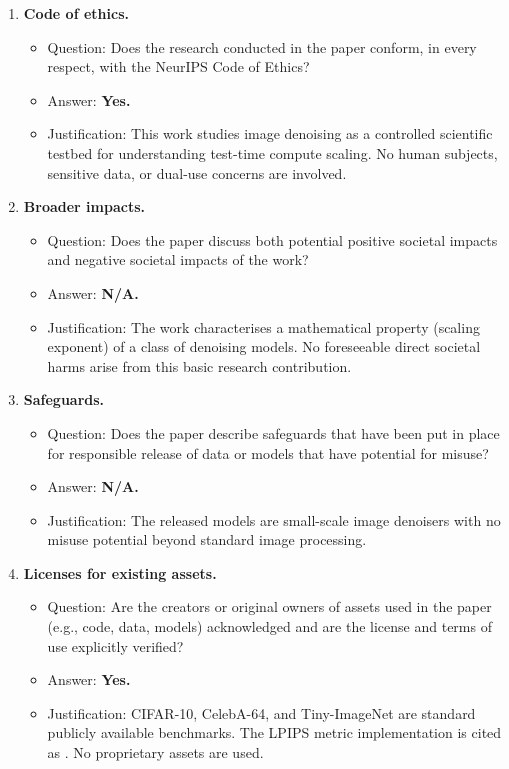 \documentclass{article}
\begin{document}
\begin{enumerate}
\item \textbf{Code of ethics.}
\begin{itemize}
  \item Question: Does the research conducted in the paper conform, in every respect, with the NeurIPS Code of Ethics?
  \item Answer: \textbf{Yes.}
  \item Justification: This work studies image denoising as a controlled scientific testbed for understanding test-time compute scaling. No human subjects, sensitive data, or dual-use concerns are involved.
\end{itemize}

\item \textbf{Broader impacts.}
\begin{itemize}
  \item Question: Does the paper discuss both potential positive societal impacts and negative societal impacts of the work?
  \item Answer: \textbf{N/A.}
  \item Justification: The work characterises a mathematical property (scaling exponent) of a class of denoising models. No foreseeable direct societal harms arise from this basic research contribution.
\end{itemize}

\item \textbf{Safeguards.}
\begin{itemize}
  \item Question: Does the paper describe safeguards that have been put in place for responsible release of data or models that have potential for misuse?
  \item Answer: \textbf{N/A.}
  \item Justification: The released models are small-scale image denoisers with no misuse potential beyond standard image processing.
\end{itemize}

\item \textbf{Licenses for existing assets.}
\begin{itemize}
  \item Question: Are the creators or original owners of assets used in the paper (e.g., code, data, models) acknowledged and are the license and terms of use explicitly verified?
  \item Answer: \textbf{Yes.}
  \item Justification: CIFAR-10, CelebA-64, and Tiny-ImageNet are standard publicly available benchmarks. The LPIPS metric implementation is cited as \citet{zhang2018perceptual}. No proprietary assets are used.
\end{itemize}


\end{enumerate}
\end{document}
